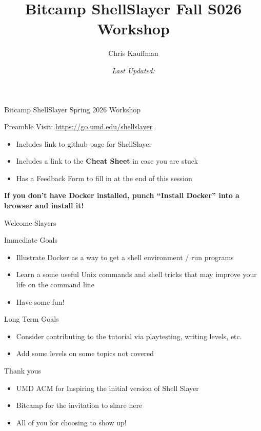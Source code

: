 \documentclass[mathserif]{beamer}
\author{Chris Kauffman}
\date{\it Last Updated: \newline }
\title{Bitcamp ShellSlayer Fall S026 Workshop}
\begin{document}
\maketitle
\begin{frame}[label={sec:orgb56e320}]{Bitcamp ShellSlayer Spring 2026 Workshop}
\begin{block}{Preamble}
Visit: \url{https://go.umd.edu/shellslayer}
\begin{itemize}
\item Includes link to github page for ShellSlayer
\item Includes a link to the \textbf{Cheat Sheet} in case you are stuck
\item Has a Feedback Form to fill in at the end of this session
\end{itemize}

\vspace{.2in}

\textbf{If you don't have Docker installed, punch ``Install Docker'' into a
browser and install it!}
\end{block}
\end{frame}
\begin{frame}[label={sec:orgf81be3d}]{Welcome Slayers}
\begin{block}{Immediate Goals}
\begin{itemize}
\item Illustrate Docker as a way to get a shell environment / run programs
\item Learn a some useful Unix commands and shell tricks that may improve
your life on the command line
\item Have some fun!
\end{itemize}
\end{block}
\begin{block}{Long Term Goals}
\begin{itemize}
\item Consider contributing to the tutorial via playtesting, writing
levels, etc.
\item Add some levels on some topics not covered
\end{itemize}
\end{block}
\begin{block}{Thank yous}
\begin{itemize}
\item UMD ACM for Inspiring the initial version of Shell Slayer
\item Bitcamp for the invitation to share here
\item All of you for choosing to show up!
\end{itemize}
\end{block}
\end{frame}
\end{document}
